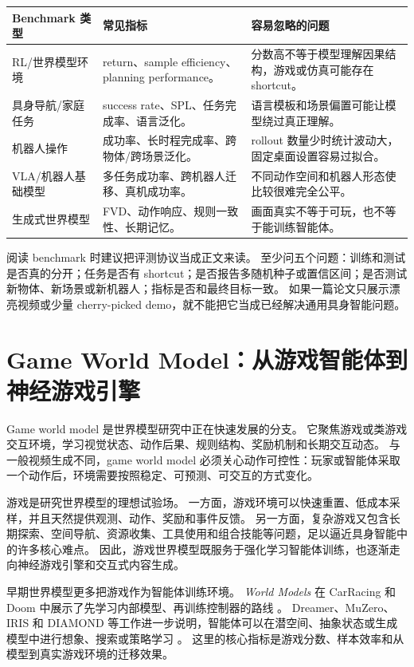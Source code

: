 \documentclass[11pt,a4paper]{ctexart}
\begin{document}
\begin{longtable}{p{} p{} p{}}
\toprule
Benchmark 类型 & 常见指标 & 容易忽略的问题 \\
\midrule
RL/世界模型环境 & return、sample efficiency、planning performance。 & 分数高不等于模型理解因果结构，游戏或仿真可能存在 shortcut。 \\
具身导航/家庭任务 & success rate、SPL、任务完成率、语言泛化。 & 语言模板和场景偏置可能让模型绕过真正理解。 \\
机器人操作 & 成功率、长时程完成率、跨物体/跨场景泛化。 & rollout 数量少时统计波动大，固定桌面设置容易过拟合。 \\
VLA/机器人基础模型 & 多任务成功率、跨机器人迁移、真机成功率。 & 不同动作空间和机器人形态使比较很难完全公平。 \\
生成式世界模型 & FVD、动作响应、规则一致性、长期记忆。 & 画面真实不等于可玩，也不等于能训练智能体。 \\
\bottomrule
\end{longtable}

阅读 benchmark 时建议把评测协议当成正文来读。
至少问五个问题：训练和测试是否真的分开；任务是否有 shortcut；是否报告多随机种子或置信区间；是否测试新物体、新场景或新机器人；指标是否和最终目标一致。
如果一篇论文只展示漂亮视频或少量 cherry-picked demo，就不能把它当成已经解决通用具身智能问题。

\section{Game World Model：从游戏智能体到神经游戏引擎}

Game world model 是世界模型研究中正在快速发展的分支。
它聚焦游戏或类游戏交互环境，学习视觉状态、动作后果、规则结构、奖励机制和长期交互动态。
与一般视频生成不同，game world model 必须关心动作可控性：玩家或智能体采取一个动作后，环境需要按照稳定、可预测、可交互的方式变化。

游戏是研究世界模型的理想试验场。
一方面，游戏环境可以快速重置、低成本采样，并且天然提供观测、动作、奖励和事件反馈。
另一方面，复杂游戏又包含长期探索、空间导航、资源收集、工具使用和组合技能等问题，足以逼近具身智能中的许多核心难点。
因此，游戏世界模型既服务于强化学习智能体训练，也逐渐走向神经游戏引擎和交互式内容生成。

早期世界模型更多把游戏作为智能体训练环境。
\emph{World Models} 在 CarRacing 和 Doom 中展示了先学习内部模型、再训练控制器的路线 \cite{ha2018worldmodels}。
Dreamer、MuZero、IRIS 和 DIAMOND 等工作进一步说明，智能体可以在潜空间、抽象状态或生成模型中进行想象、搜索或策略学习 \cite{hafner2020dreamer,schrittwieser2020muzero,micheli2022iris,alonso2024diamond}。
这里的核心指标是游戏分数、样本效率和从模型到真实游戏环境的迁移效果。
\end{document}
